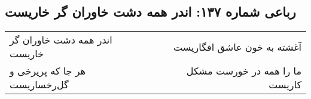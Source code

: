 \begin{center}
\section*{رباعی شماره ۱۳۷: اندر همه دشت خاوران گر خاریست}
\label{sec:sh137}
\begin{longtable}{l p{0.5cm} r}
اندر همه دشت خاوران گر خاریست
&&
آغشته به خون عاشق افگاریست
\\
هر جا که پریرخی و گل‌رخساریست
&&
ما را همه در خورست مشکل کاریست
\\
\end{longtable}
\end{center}
